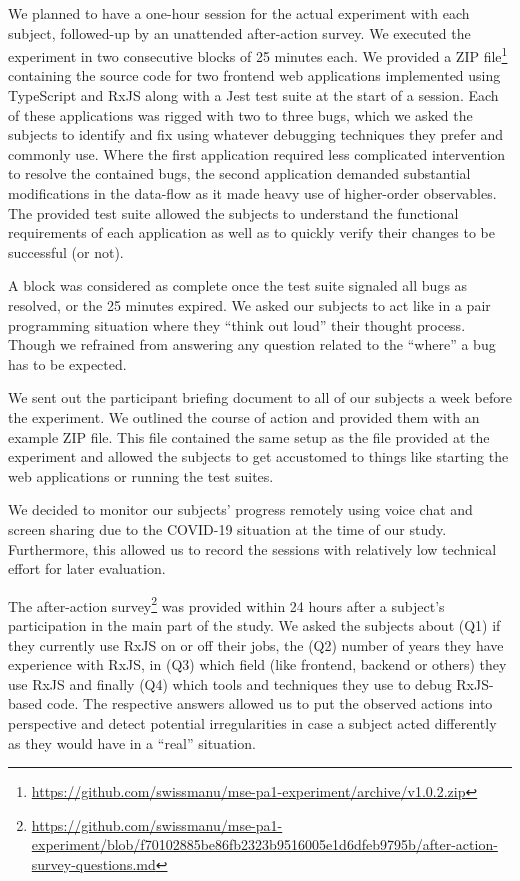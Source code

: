 \documentclass[sigplan,screen]{acmart}
\begin{document}
We planned to have a one-hour session for the actual experiment with each subject, followed-up by an unattended after-action survey. We executed the experiment in two consecutive blocks of 25 minutes each. We provided a ZIP file\footnote{\url{https://github.com/swissmanu/mse-pa1-experiment/archive/v1.0.2.zip}} containing the source code for two frontend web applications implemented using TypeScript and RxJS along with a Jest test suite at the start of a session. Each of these applications was rigged with two to three bugs, which we asked the subjects to identify and fix using whatever debugging techniques they prefer and commonly use. Where the first application required less complicated intervention to resolve the contained bugs, the second application demanded substantial modifications in the data-flow as it made heavy use of higher-order observables. The provided test suite allowed the subjects to understand the functional requirements of each application as well as to quickly verify their changes to be successful (or not).

A block was considered as complete once the test suite signaled all bugs as resolved, or the 25 minutes expired. We asked our subjects to act like in a pair programming situation where they ``think out loud'' their thought process. Though we refrained from answering any question related to the ``where'' a bug has to be expected.

We sent out the participant briefing document to all of our subjects a week before the experiment. We outlined the course of action and provided them with an example ZIP file. This file contained the same setup as the file provided at the experiment and allowed the subjects to get accustomed to things like starting the web applications or running the test suites.

We decided to monitor our subjects' progress remotely using voice chat and screen sharing due to the COVID-19 situation at the time of our study. Furthermore, this allowed us to record the sessions with relatively low technical effort for later evaluation.

The after-action survey\footnote{\url{https://github.com/swissmanu/mse-pa1-experiment/blob/f70102885be86fb2323b9516005e1d6dfeb9795b/after-action-survey-questions.md}} was provided within 24 hours after a subject's participation in the main part of the study. We asked the subjects about (Q1) if they currently use RxJS on or off their jobs, the (Q2) number of years they have experience with RxJS, in (Q3) which field (like frontend, backend or others) they use RxJS and finally (Q4) which tools and techniques they use to debug RxJS-based code. The respective answers allowed us to put the observed actions into perspective and detect potential irregularities in case a subject acted differently as they would have in a ``real'' situation.
\end{document}

